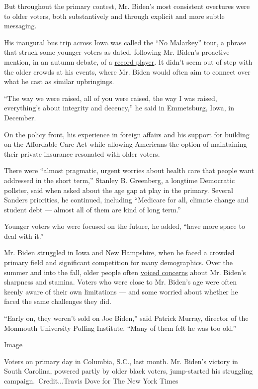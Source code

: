 But throughout the primary contest, Mr. Biden's most consistent
overtures were to older voters, both substantively and through explicit
and more subtle messaging.

His inaugural bus trip across Iowa was called the ``No Malarkey'' tour,
a phrase that struck some younger voters as dated, following Mr. Biden's
proactive mention, in an autumn debate, of a
\href{https://www.nytimes.com/2019/09/12/us/politics/biden-record-player.html}{record
player}. It didn't seem out of step with the older crowds at his events,
where Mr. Biden would often aim to connect over what he cast as similar
upbringings.

``The way we were raised, all of you were raised, the way I was raised,
everything's about integrity and decency,'' he said in Emmetsburg, Iowa,
in December.

On the policy front, his experience in foreign affairs and his support
for building on the Affordable Care Act while allowing Americans the
option of maintaining their private insurance resonated with older
voters.

There were ``almost pragmatic, urgent worries about health care that
people want addressed in the short term,'' Stanley B. Greenberg, a
longtime Democratic pollster, said when asked about the age gap at play
in the primary. Several Sanders priorities, he continued, including
``Medicare for all, climate change and student debt --- almost all of
them are kind of long term.''

Younger voters who were focused on the future, he added, ``have more
space to deal with it.''

Mr. Biden struggled in Iowa and New Hampshire, when he faced a crowded
primary field and significant competition for many demographics. Over
the summer and into the fall, older people often
\href{https://www.nytimes.com/2019/07/29/us/politics/joe-biden-age.html}{voiced
concerns} about Mr. Biden's sharpness and stamina. Voters who were close
to Mr. Biden's age were often keenly aware of their own limitations ---
and some worried about whether he faced the same challenges they did.

``Early on, they weren't sold on Joe Biden,'' said Patrick Murray,
director of the Monmouth University Polling Institute. ``Many of them
felt he was too old.''

Image

Voters on primary day in Columbia, S.C., last month. Mr. Biden's victory
in South Carolina, powered partly by older black voters, jump-started
his struggling campaign.~Credit...Travis Dove for The New York Times

